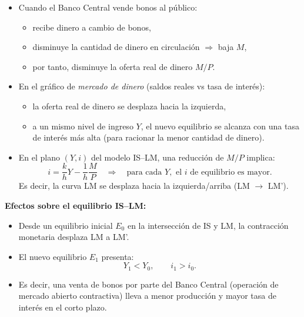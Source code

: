 \documentclass[11pt,addpoints]{article}
\begin{document}
\begin{itemize}
  \item Cuando el Banco Central vende bonos al público:
  \begin{itemize}
    \item recibe dinero a cambio de bonos,
    \item disminuye la cantidad de dinero en circulación $\Rightarrow$ baja $M$,
    \item por tanto, disminuye la oferta real de dinero $M/P$.
  \end{itemize}
  \item En el gráfico de \emph{mercado de dinero} (saldos reales vs tasa de interés):
  \begin{itemize}
    \item la oferta real de dinero se desplaza hacia la izquierda,
    \item a un mismo nivel de ingreso $Y$, el nuevo equilibrio se alcanza con una tasa de interés más alta (para racionar la menor cantidad de dinero).
  \end{itemize}
  \item En el plano $(Y,i)$ del modelo IS--LM, una reducción de $M/P$ implica:
  \[
    i = \frac{k}{h}Y - \frac{1}{h}\frac{M}{P} \quad \Rightarrow \quad
    \text{para cada } Y, \text{ el } i \text{ de equilibrio es mayor}.
  \]
  Es decir, la curva LM se desplaza hacia la izquierda/arriba (LM $\to$ LM').
\end{itemize}

\textbf{Efectos sobre el equilibrio IS--LM:}
\begin{itemize}
  \item Desde un equilibrio inicial $E_0$ en la intersección de IS y LM, la contracción monetaria desplaza LM a LM'.
  \item El nuevo equilibrio $E_1$ presenta:
  \[
    Y_1 < Y_0, \qquad i_1 > i_0.
  \]
  \item Es decir, una venta de bonos por parte del Banco Central (operación de mercado abierto contractiva) lleva a menor producción y mayor tasa de interés en el corto plazo.
\end{itemize}
\end{document}
